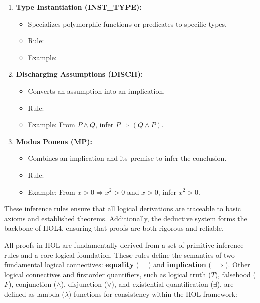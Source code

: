 \begin{enumerate}
    \item \textbf{Type Instantiation (INST\_TYPE):}
    \begin{itemize}
        \item Specializes polymorphic functions or predicates to specific types.
        \item Rule:
        \item Example:
    \end{itemize}

    \item \textbf{Discharging Assumptions (DISCH):}
    \begin{itemize}
        \item Converts an assumption into an implication.
        \item Rule:
        \item Example: From $P \wedge Q$, infer $P \Rightarrow (Q \wedge P)$.
    \end{itemize}

    \item \textbf{Modus Ponens (MP):}
    \begin{itemize}
        \item Combines an implication and its premise to infer the conclusion.
        \item Rule:
        \item Example: From $x > 0 \Rightarrow x^2 > 0$ and $x > 0$, infer $x^2 > 0$.
    \end{itemize}
\end{enumerate}
These inference rules ensure that all logical derivations are traceable to basic axioms and established theorems. Additionally, the deductive system forms the backbone of HOL4, ensuring that proofs are both rigorous and reliable.

All proofs in HOL are fundamentally derived from a set of primitive inference rules and a core logical foundation. These rules define the semantics of two fundamental logical connectives: \textbf{equality} ($=$) and \textbf{implication} ($\implies$). Other logical connectives and first\-order quantifiers, such as logical truth ($T$), falsehood ($F$), conjunction ($\wedge$), disjunction ($\vee$), and existential quantification ($\exists$), are defined as lambda ($\lambda$) functions for consistency within the HOL framework:


